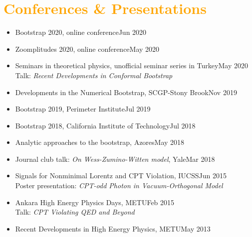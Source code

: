 \documentclass[letterpaper,11pt]{article}
\begin{document}
\section{\textcolor{Orange}{Conferences \& Presentations}}
\begin{itemize}[itemsep=.001em] 
	\item[] Bootstrap 2020, online conference\hfill Jun 2020
	\item[] Zoomplitudes 2020, online conference\hfill May 2020
	\item[] Seminars in theoretical physics, unofficial seminar series in Turkey\hfill May 2020\\
	\hspace*{1.8em}Talk: \emph{Recent Developments in Conformal Bootstrap}
	\item[] Developments in the Numerical Bootstrap, SCGP-Stony Brook\hfill Nov 2019\\
	\item[] Bootstrap 2019, Perimeter Institute\hfill Jul 2019
	\item[]Bootstrap 2018, California Institute of Technology\hfill  Jul 2018
	\item[] Analytic approaches to the bootstrap, Azores\hfill May 2018
	\item[] Journal club talk: \emph{On Wess-Zumino-Witten model}, Yale\hfill Mar 2018
	\item[] Signals for Nonminimal Lorentz and CPT Violation, IUCSS\hfill Jun 2015\\
					\hspace*{1.8em}Poster presentation: \emph{CPT-odd Photon in Vacuum-Orthogonal Model}
	\item[] Ankara High Energy Physics Days, METU\hfill Feb 2015\\
					\hspace*{1.8em}Talk: \emph{CPT Violating QED and Beyond}
	\item[] Recent Developments in High Energy Physics, METU\hfill May 2013
\end{itemize}
\end{document}
